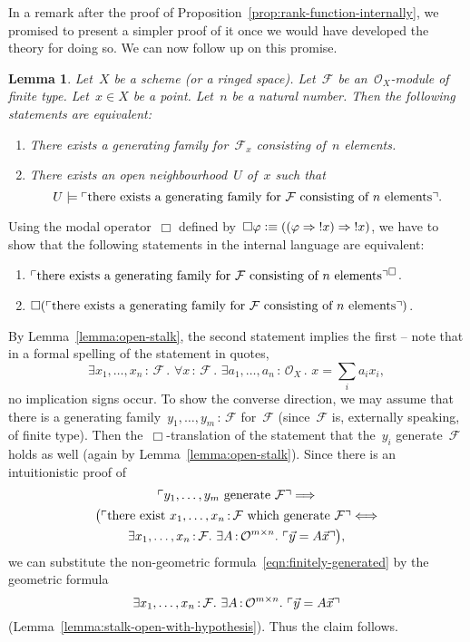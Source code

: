 \documentclass[10pt,reqno,a4paper]{amsbook}
\makeatletter
\theoremstyle{definition}
\theoremstyle{plain}
\newtheorem{lemma}[defn]{Lemma}
\theoremstyle{remark}
\newcommand{\F}{\mathcal{F}}
\renewcommand{\O}{\mathcal{O}}
\newcommand{\?}{\,{:}\,}
\renewcommand{\_}{\mathpunct{.}\,}
\newcommand{\speak}[1]{\ulcorner\text{\textnormal{#1}}\urcorner}
\newcommand{\notat}[1]{{!#1}}
\newcommand{\defequiv}{\vcentcolon\equiv}
\renewenvironment{proof}[1][\proofname]{\par
  \pushQED{\qed}%
  \normalfont \topsep6\p@\@plus6\p@\relax
  \trivlist
  \item[\hskip\labelsep
        \itshape
    #1\@addpunct{.}]\ignorespaces
}{%
  \popQED\endtrivlist\@endpefalse
}
\makeatother
\begin{document}
In a remark after the proof of Proposition~\ref{prop:rank-function-internally},
we promised to present a simpler proof of it once we would have developed the theory for
doing so. We can now follow up on this promise.
\begin{lemma}\label{lemma:gen-family-n}
Let~$X$ be a scheme (or a ringed space). Let~$\F$ be an~$\O_X$-module
of finite type. Let~$x \in X$ be a point. Let~$n$ be a natural number. Then the
following statements are equivalent:
\begin{enumerate}
\item There exists a generating family for~$\F_x$ consisting of~$n$ elements.
\item There exists an open neighbourhood~$U$ of~$x$ such that
\[ U \models \speak{there exists a generating family for~$\F$ consisting of~$n$
elements}. \]
\end{enumerate}
\end{lemma}
\begin{proof}Using the modal operator~$\Box$ defined by~$\Box\varphi \defequiv
((\varphi \Rightarrow \notat{x}) \Rightarrow \notat{x})$, we have to show that
the following statements in the internal language are equivalent:
\begin{enumerate}
\item $\speak{there exists a generating family
for~$\F$ consisting of~$n$ elements}^\Box$.
\item $\Box(\speak{there exists a generating family
for~$\F$ consisting of~$n$ elements})$.
\end{enumerate}
By Lemma~\ref{lemma:open-stalk}, the second statement implies the first -- note
that in a formal spelling of the statement in quotes,
\begin{equation}\label{eqn:finitely-generated}
  \exists x_1,\ldots,x_n\?\F\_
  \forall x\?\F\_
  \exists a_1,\ldots,a_n\?\O_X\_
  x = \textstyle\sum_i a_i x_i,
\end{equation}
no implication signs occur. To show the converse direction,
we may assume that there is a generating family~$y_1,\ldots,y_m\?\F$ for~$\F$
(since~$\F$ is, externally speaking, of finite type). Then
the~$\Box$-translation of the statement that the~$y_i$ generate~$\F$ holds as
well (again by Lemma~\ref{lemma:open-stalk}). Since there is an intuitionistic
proof of
\begin{multline*}
  \speak{$y_1,\ldots,y_m$ generate~$\F$} \Longrightarrow \\
  \bigl(\speak{there exist $x_1,\ldots,x_n\?\F$ which generate~$\F$}
    \Longleftrightarrow \\
    \exists x_1,\ldots,x_n\?\F\_
    \exists A\?\O^{m \times n}\_ \speak{$\vec y = A \vec x$}\bigr),
\end{multline*}
we can substitute the non-geometric formula~\eqref{eqn:finitely-generated} by the geometric
formula
\[ \exists x_1,\ldots,x_n\?\F\_ \exists A\?\O^{m \times n}\_ \speak{$\vec
y = A \vec x$} \]
(Lemma~\ref{lemma:stalk-open-with-hypothesis}). Thus the claim follows.
\end{proof}
\end{document}
